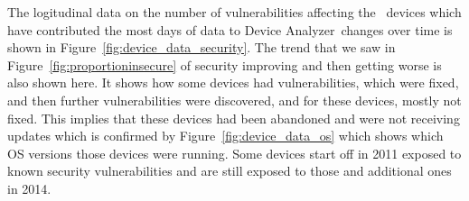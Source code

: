\documentclass[conference,a4paper,twoside]{IEEEtran}
\newcommand{\da}{Device Analyzer}
\begin{document}
The logitudinal data on the number of vulnerabilities affecting the \daNumDeviceDataDevices\ devices which have contributed the most days of data to \da\ changes over time is shown in Figure~\ref{fig:device_data_security}.
The trend that we saw in Figure~\ref{fig:proportioninsecure} of security improving and then getting worse is also shown here.
It shows how some devices had vulnerabilities, which were fixed, and then further vulnerabilities were discovered, and for these devices, mostly not fixed.
This implies that these devices had been abandoned and were not receiving updates which is confirmed by Figure~\ref{fig:device_data_os} which shows which OS versions those devices were running.
Some devices start off in 2011 exposed to known security vulnerabilities and are still exposed to those and additional ones in 2014.
\end{document}
